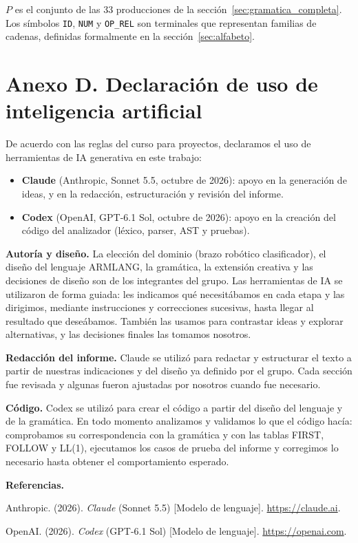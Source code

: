 \documentclass[10pt,a4paper]{article}
\newcommand{\tm}[1]{\texttt{#1}}                                          %
\begin{document}
$P$ es el conjunto de las 33 producciones de la sección~\ref{sec:gramatica_completa}. Los símbolos \tm{ID}, \tm{NUM} y
\tm{OP\_REL} son terminales que representan familias de cadenas, definidas formalmente en la sección~\ref{sec:alfabeto}.

\section*{Anexo D. Declaración de uso de inteligencia artificial}
\hypertarget{anexoD}{}

De acuerdo con las reglas del curso para proyectos, declaramos el uso de
herramientas de IA generativa en este trabajo:

\begin{itemize}[nosep]
\item \textbf{Claude} (Anthropic, Sonnet 5.5, octubre de 2026): apoyo en la
generación de ideas, y en la redacción, estructuración y revisión del informe.
\item \textbf{Codex} (OpenAI, GPT-6.1 Sol, octubre de 2026): apoyo en la creación del
código del analizador (léxico, parser, AST y pruebas).
\end{itemize}

\textbf{Autoría y diseño.} La elección del dominio (brazo robótico
clasificador), el diseño del lenguaje ARMLANG, la gramática, la extensión
creativa y las decisiones de diseño son de los integrantes del grupo. Las
herramientas de IA se utilizaron de forma guiada: les indicamos qué necesitábamos
en cada etapa y las dirigimos, mediante instrucciones y correcciones sucesivas,
hasta llegar al resultado que deseábamos. También las usamos para contrastar
ideas y explorar alternativas, y las decisiones finales las tomamos nosotros.

\textbf{Redacción del informe.} Claude se utilizó para redactar y estructurar el
texto a partir de nuestras indicaciones y del diseño ya definido por el grupo.
Cada sección fue revisada y algunas fueron ajustadas por nosotros cuando fue necesario.

\textbf{Código.} Codex se utilizó para crear el código a partir del diseño
del lenguaje y de la gramática. En todo momento analizamos y validamos lo que el
código hacía: comprobamos su correspondencia con la gramática y con las tablas
FIRST, FOLLOW y LL(1), ejecutamos los casos de prueba del informe y corregimos
lo necesario hasta obtener el comportamiento esperado.

\textbf{Referencias.} 

Anthropic. (2026). \emph{Claude} (Sonnet 5.5) [Modelo de lenguaje].
\url{https://claude.ai}.

OpenAI. (2026). \emph{Codex} (GPT-6.1 Sol) [Modelo de lenguaje].
\url{https://openai.com}.
\end{document}

